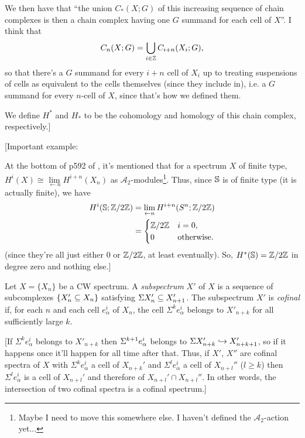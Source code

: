 \documentclass{MetricNotes2023}
\def\bb{\ensuremath\mathbb}
\def\subq{\ensuremath\subseteq}
\def\inj{\ensuremath\hookrightarrow}
\def\inte{\ensuremath\mathbb{Z}}
\def\del{\ensuremath\partial}
\def\SIgma{\ensuremath\Sigma}
\def\A{\ensuremath{\mathscr{A}_2}}
\begin{document}
We then have that ``the union \(C_*(X ; G)\) of this increasing sequence of chain complexes is then a chain complex having one \(G\) summand for each cell of \(X\)''. I think that 
\[C_n(X ; G)=\bigcup_{i\in \inte}C_{i+n}(X_i; G),\] 
so that there's a \(G\) summand for every \(i+n\) cell of \(X_i\) up to treating suspensions of cells as equivalent to the cells themselves (since they include in), i.e. a \(G\) summand for every \(n\)-cell of \(X\), since that's how we defined them.


We define \(H^*\) and \(H_*\) to be the cohomology and homology of this chain complex, respectively.]

[Important example:

At the bottom of p592 of \autocite{hatcher5}, it's mentioned that for a spectrum \(X\) of finite type, \(H^i(X)\cong \lim\limits_{\leftarrow n}H^{i+n}(X_n)\) as \(\mathscr{A}_2\)-modules\footnote{Maybe I need to move this somewhere else. I haven't  defined the \(\A\)-action yet...}. Thus, since \(\bb{S}\) is of finite type (it is actually finite), we have
\begin{align*}
H^i(\bb{S}; \inte/2\inte)&=\lim\limits_{\leftarrow n}H^{i+n}(S^n; \inte/2\inte)\\
&=\begin{cases}
\inte/2\inte & i = 0,\\
0 & \text{otherwise.}
\end{cases}
\end{align*}
(since they're all just either \(0\) or \(\inte/2\inte\), at least eventually). So, \(H^*(\bb{S})=\inte/2\inte\) in degree zero and nothing else.]

\begin{definition}
Let \(X=\{X_n\}\) be a CW spectrum. A \textit{subspectrum} \(X'\) of \(X\) is a sequence of subcomplexes \(\{X_n'\subq X_n\}\) satisfying \(\Sigma X_n'\subq X_{n+1}'\). The subspectrum \(X'\) is \textit{cofinal} if, for each \(n\) and each cell \(e^i_\alpha\) of \(X_n\), the cell \(\Sigma^k e_\alpha^i\) belongs to \(X'_{n+k}\) for all sufficiently large \(k\).
\end{definition}

[If \(\Sigma^ke^i_\alpha\) belongs to \(X'_{n+k}\) then \(\SIgma^{k+1}e^i_\alpha\) belongs to \(\Sigma X'_{n+k}\inj X'_{n+k+1}\), so if it happens once it'll happen for all time after that. Thus, if \(X'\), \(X''\) are cofinal spectra of \(X\) with \(\Sigma^k e_{\alpha}^i\) a cell of \(X_{n+k}'\) and \(\Sigma^l e_\alpha^i\) a cell of \(X_{n+l}''\) (\(l\geq k\)) then \(\Sigma^l e_\alpha^i\) is a cell of \(X_{n+l}'\) and therefore of \(X_{n+l}'\cap X_{n+l}''\). In other words, the intersection of two cofinal spectra is a cofinal spectrum.]
\end{document}
